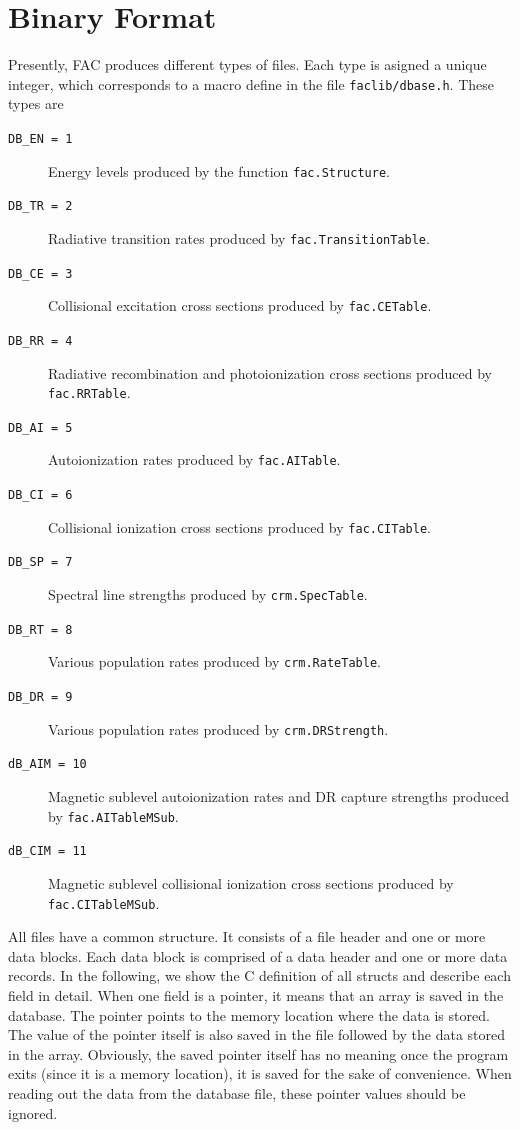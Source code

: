 \documentclass[twoside,letterpaper]{refrep}
\begin{document}
\section{Binary Format}
\label{sec:binary}
Presently, FAC produces different types of files. Each type is asigned
a unique integer, which corresponds to a macro define in the file
\verb|faclib/dbase.h|. These types are
\begin{description}
\item[\texttt{DB\_EN = 1}] Energy levels produced by the function
\verb|fac.Structure|. 
\item[\texttt{DB\_TR = 2}] Radiative transition rates produced by
\verb|fac.TransitionTable|.
\item[\texttt{DB\_CE = 3}] Collisional excitation cross sections produced by
\verb|fac.CETable|. 
\item[\texttt{DB\_RR = 4}] Radiative recombination and photoionization cross
sections produced by \verb|fac.RRTable|.
\item[\texttt{DB\_AI = 5}] Autoionization rates produced by \verb|fac.AITable|.
\item[\texttt{DB\_CI = 6}] Collisional ionization cross sections produced by
\verb|fac.CITable|. 
\item[\texttt{DB\_SP = 7}] Spectral line strengths produced by
\verb|crm.SpecTable|. 
\item[\texttt{DB\_RT = 8}] Various population rates produced by
\verb|crm.RateTable|. 
\item[\texttt{DB\_DR = 9}] Various population rates produced by
\verb|crm.DRStrength|.
\item[\texttt{dB\_AIM = 10}] Magnetic sublevel autoionization rates and DR
capture strengths produced by \verb|fac.AITableMSub|.
\item[\texttt{dB\_CIM = 11}] Magnetic sublevel collisional ionization cross
  sections produced by \verb|fac.CITableMSub|.
\end{description}

All files have a common structure. It consists of a file header and one or
more data blocks. Each data block is comprised of a data header and one or
more data records. In the following, we show the C definition of all structs
and describe each field in detail. When one field is a pointer, it means that
an array is saved in the database. The pointer points to the memory location
where the data is stored. The value of the pointer itself is also
saved in the file followed by the data stored in the array. Obviously, the
saved pointer itself has no meaning once the program exits (since it is a
memory location), it is saved for the sake of convenience. When reading out
the data from the database file, these pointer values should be ignored.
\end{document}
